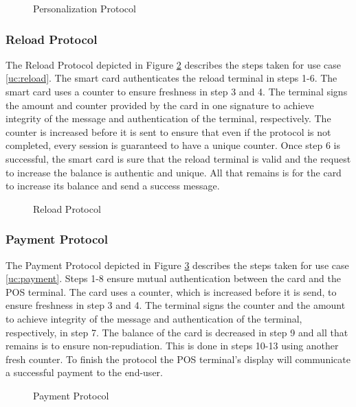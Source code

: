  \begin{figure}[h!]
     \centering
     
     \caption{Personalization Protocol}
     \label{fig:PersonProtocol}
 \end{figure}

\subsubsection{Reload Protocol}
The Reload Protocol depicted in Figure \ref{fig:ReloadProtocol} describes the steps taken for use case \ref{uc:reload}.
The smart card authenticates the reload terminal in steps 1-6.
The smart card uses a counter to ensure freshness in step 3 and 4.
The terminal signs the amount and counter provided by the card in one signature to achieve integrity of the message and authentication of the terminal, respectively.
The counter is increased before it is sent to ensure that even if the protocol is not completed, every session is guaranteed to have a unique counter.
Once step 6 is successful, the smart card is sure that the reload terminal is valid and the request to increase the balance is authentic and unique.
All that remains is for the card to increase its balance and send a success message.
 \begin{figure}[h!]
     \centering
     
     \caption{Reload Protocol}
     \label{fig:ReloadProtocol}
 \end{figure}

\subsubsection{Payment Protocol}
The Payment Protocol depicted in Figure \ref{fig:POSProtocol} describes the steps taken for use case \ref{uc:payment}.
Steps 1-8 ensure mutual authentication between the card and the POS terminal.
The card uses a counter, which is increased before it is send, to ensure freshness in step 3 and 4.
The terminal signs the counter and the amount to achieve integrity of the message and authentication of the terminal, respectively, in step 7.
The balance of the card is decreased in step 9 and all that remains is to ensure non-repudiation.
This is done in steps 10-13 using another fresh counter.
To finish the protocol the POS terminal's display will communicate a successful payment to the end-user.
\begin{figure}[h!]
    \centering
    
    \caption{Payment Protocol}
    \label{fig:POSProtocol}
\end{figure}


